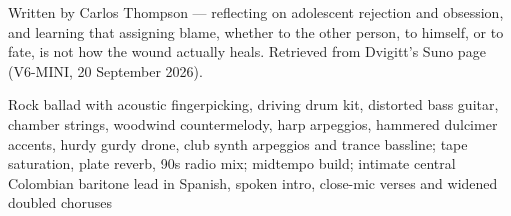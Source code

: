 
\label{sec:buscando-culpables}
\begin{notes}
Written by Carlos Thompson — reflecting on adolescent rejection and obsession, and learning that assigning blame, whether to the other person, to himself, or to fate, is not how the wound actually heals. Retrieved from Dvigitt's Suno page (V6-MINI, 20 September 2026).
\end{notes}
\begin{style}
Rock ballad with acoustic fingerpicking, driving drum kit, distorted bass guitar, chamber strings, woodwind countermelody, harp arpeggios, hammered dulcimer accents, hurdy gurdy drone, club synth arpeggios and trance bassline; tape saturation, plate reverb, 90s radio mix; midtempo build; intimate central Colombian baritone lead in Spanish, spoken intro, close-mic verses and widened doubled choruses
\end{style}

